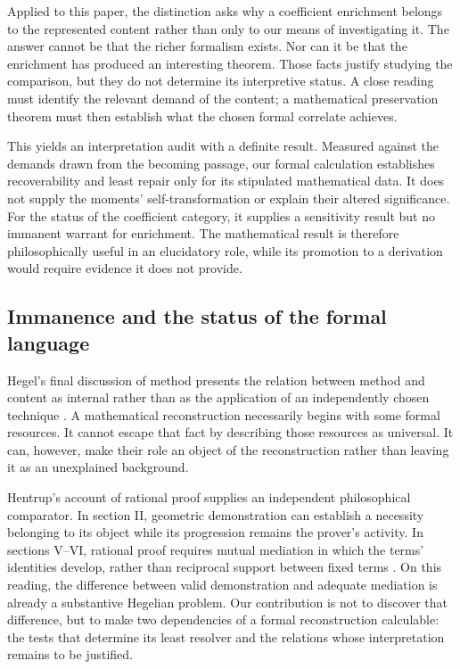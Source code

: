 Applied to this paper, the distinction asks why a coefficient enrichment
belongs to the represented content rather than only to our means of
investigating it. The answer cannot be that the richer formalism exists.
Nor can it be that the enrichment has produced an interesting theorem.
Those facts justify studying the comparison, but they do not determine
its interpretive status. A close reading must identify the relevant demand
of the content; a mathematical preservation theorem must then establish
what the chosen formal correlate achieves.

This yields an interpretation audit with a definite result. Measured
against the demands drawn from the becoming passage, our formal calculation
establishes recoverability and least repair only for its stipulated
mathematical data. It does not supply the moments'
self-transformation or explain their altered significance. For the status
of the coefficient category, it supplies a sensitivity result but no
immanent warrant for enrichment. The mathematical result is therefore
philosophically useful in an elucidatory role, while its promotion to a
derivation would require evidence it does not provide.

\subsection{Immanence and the status of the formal language}

Hegel's final discussion of method presents the relation between method and
content as internal rather than as the application of an independently
chosen technique \cite{HegelIdea}. A mathematical reconstruction necessarily
begins with some formal resources. It cannot escape that fact by describing
those resources as universal. It can, however, make their role an object
of the reconstruction rather than leaving it as an unexplained background.

Hentrup's account of rational proof supplies an independent philosophical
comparator. In section II, geometric demonstration can establish a
necessity belonging to its object while its progression remains the
prover's activity. In sections V--VI, rational proof requires mutual
mediation in which the terms' identities develop, rather than reciprocal
support between fixed terms \cite{Hentrup}. On this reading, the
difference between valid demonstration and adequate mediation is already
a substantive Hegelian problem. Our contribution is not to discover that
difference, but to make two dependencies of a formal reconstruction
calculable: the tests that determine its least resolver and the
relations whose interpretation remains to be justified.


